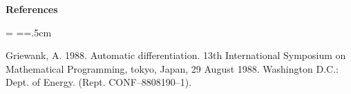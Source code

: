 \bigbreak
\centerline{\bf References}
\bigskip

{

\rmsmall\parindent=0cm \parskip=\medskipamount
\everypar={\hangindent=.5cm }

\par
Griewank, A. 1988. Automatic differentiation. 
   13th International Symposium on Mathematical Programming,
   tokyo, Japan, 29 August 1988. Washington D.C.: Dept. of Energy.
   (Rept. CONF--8808190--1).
}
\vfill\eject

